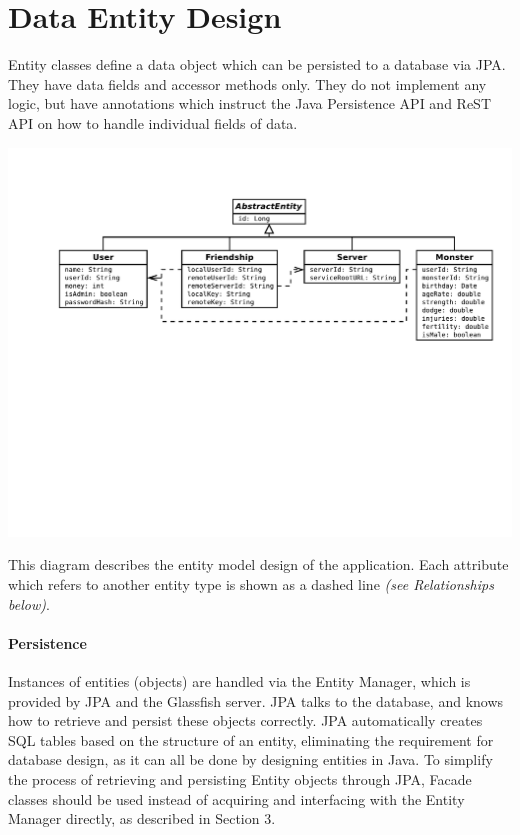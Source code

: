 \section{Data Entity Design}
Entity classes define a data object which can be persisted to a database via JPA. They have data fields and accessor methods only. They do not implement any logic, but have annotations which instruct the Java Persistence API and ReST API on how to handle individual fields of data.
\\
\begin{center}
\includegraphics[width=\textwidth]{img/entitydiagram.pdf} 
\end{center}

This diagram describes the entity model design of the application. Each attribute which refers to another entity type is shown as a dashed line \textit{(see Relationships below)}.

\paragraph{Persistence}
Instances of entities (objects) are handled via the Entity Manager, which is provided by JPA and the Glassfish server. JPA talks to the database, and knows how to retrieve and persist these objects correctly. JPA automatically creates SQL tables based on the structure of an entity, eliminating the requirement for database design, as it can all be done by designing entities in Java. To simplify the process of retrieving and persisting Entity objects through JPA, Facade classes should be used instead of acquiring and interfacing with the Entity Manager directly, as described in Section 3.

